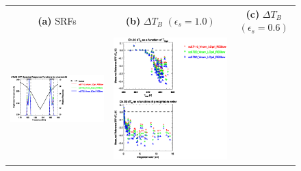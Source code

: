 \begin{figure}[H]
  \centering
  \begin{tabular}{c c c}
    \textsf{\textbf{(a)} SRFs} &
    \textsf{\textbf{(b)} $\Delta T_B$ $(\epsilon_s = 1.0)$} &
    \textsf{\textbf{(c)} $\Delta T_B$ $(\epsilon_s = 0.6)$} \\
    \includegraphics[bb=80 400 280 558,clip,scale=0.85]{graphics/srf/Tset/atms_npp.ch20.osrf.eps} &
    \includegraphics[bb=85 400 260 558,clip,scale=0.85]{graphics/dtb/Tset/e1.0_r0.0/atms_npp.ch20.dTb.eps} & 

\end{tabular}
\end{figure}
